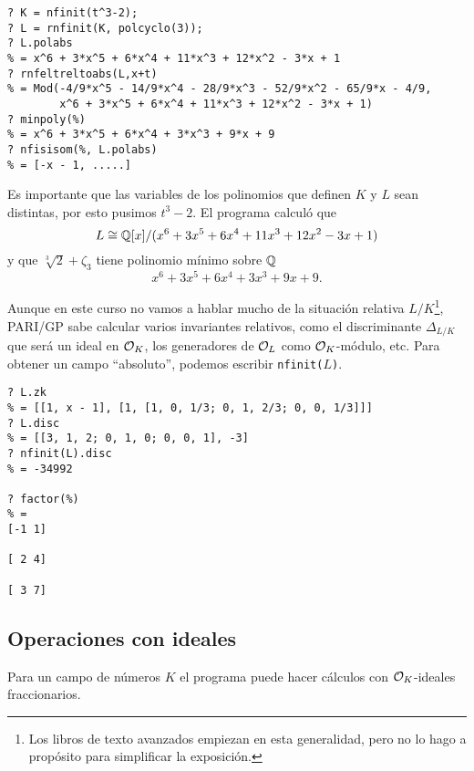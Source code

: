 \begin{shaded}
\begin{verbatim}
? K = nfinit(t^3-2);
? L = rnfinit(K, polcyclo(3));
? L.polabs
% = x^6 + 3*x^5 + 6*x^4 + 11*x^3 + 12*x^2 - 3*x + 1
? rnfeltreltoabs(L,x+t)
% = Mod(-4/9*x^5 - 14/9*x^4 - 28/9*x^3 - 52/9*x^2 - 65/9*x - 4/9,
        x^6 + 3*x^5 + 6*x^4 + 11*x^3 + 12*x^2 - 3*x + 1)
? minpoly(%)
% = x^6 + 3*x^5 + 6*x^4 + 3*x^3 + 9*x + 9
? nfisisom(%, L.polabs)
% = [-x - 1, .....]
\end{verbatim}
\end{shaded}

Es importante que las variables de los polinomios que definen $K$ y $L$ sean
distintas, por esto pusimos $t^3 - 2$. El programa calculó que
$$L \cong \mathbb{Q}[x]/(x^6 + 3 x^5 + 6 x^4 + 11 x^3 + 12 x^2 - 3 x + 1)$$
y que $\sqrt[3]{2} + \zeta_3$ tiene polinomio mínimo sobre $\mathbb{Q}$
$$x^6 + 3 x^5 + 6 x^4 + 3 x^3 + 9 x + 9.$$

Aunque en este curso no vamos a hablar mucho de la situación relativa
$L/K$\footnote{Los libros de texto avanzados empiezan en esta generalidad, pero
  no lo hago a propósito para simplificar la exposición.}, PARI/GP sabe calcular
varios invariantes relativos, como el discriminante $\Delta_{L/K}$ que será un
ideal en $\mathcal{O}_K$, los generadores de $\mathcal{O}_L$ como $\mathcal{O}_K$-módulo, etc. Para obtener
un campo ``absoluto'', podemos escribir \texttt{nfinit($L$)}.

\begin{shaded}
\begin{verbatim}
? L.zk
% = [[1, x - 1], [1, [1, 0, 1/3; 0, 1, 2/3; 0, 0, 1/3]]]
? L.disc
% = [[3, 1, 2; 0, 1, 0; 0, 0, 1], -3]
? nfinit(L).disc
% = -34992

? factor(%)
% = 
[-1 1]

[ 2 4]

[ 3 7]
\end{verbatim}
\end{shaded}


\subsection{Operaciones con ideales}

Para un campo de números $K$ el programa puede hacer cálculos con $\mathcal{O}_K$-ideales
fraccionarios.

